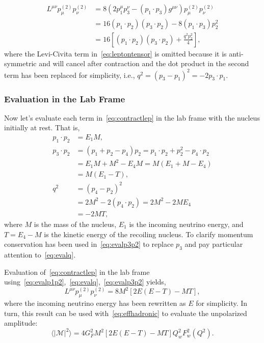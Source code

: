 \begin{align}
L^{\mu \nu}p_{\mu}^{(2)}p_{\nu}^{(2)} &= 8(2p_1^{\mu}p_3^{\nu}-(p_1\cdot p_3)g^{\mu \nu})p_{\mu}^{(2)}p_{\nu}^{(2)} \nonumber \\
&= 16(p_1\cdot p_2)(p_3\cdot p_2)-8(p_1\cdot p_3)p_2^2 \nonumber \\
&= 16\left[ (p_1\cdot p_2)(p_3\cdot p_2)+\frac{q^2p_2^2}{4}\right], \label{eq:contractlep}
\end{align}
where the Levi-Civita term in~\eqref{eq:leptontensor} is omitted because it is anti-symmetric and will cancel after contraction and the dot product in the second term has been replaced for simplicity, i.e., $q^2=(p_3-p_1)^2=-2p_3\cdot p_1$.

\subsubsection{Evaluation in the Lab Frame}
Now let's evaluate each term in~\eqref{eq:contractlep} in the lab frame with the nucleus initially at rest. That is,
\begin{align}\label{eq:evalp1p2}
p_1\cdot p_2 &= E_1M, 
\\
p_3\cdot p_2 &= (p_1+p_2-p_4)p_2= p_1\cdot p_2 +p_2^2 - p_4\cdot p_2 \nonumber \\ 
&= E_1M+M^2-E_4M = M(E_1+M-E_4)\nonumber \\
&=M(E_1-T),\label{eq:evalp3p2} 
\\
q^2 &=(p_4-p_2)^2 \nonumber \\
&= 2M^2-2(p_4\cdot p_2)=2M^2-2ME_4 \nonumber \\
&=-2MT, \label{eq:evalq}
\end{align}
where $M$ is the mass of the nucleus, $E_1$ is the incoming neutrino energy, and $T=E_4-M$ is the kinetic energy of the recoiling nucleus. To clarify momentum conservation has been used in~\eqref{eq:evalp3p2} to replace $p_3$ and pay particular attention to~\eqref{eq:evalq}. 

Evaluation of~\eqref{eq:contractlep} in the lab frame using~\eqref{eq:evalp1p2},~\eqref{eq:evalq},~\eqref{eq:evalp3p2} yields,
\begin{equation}
L^{\mu \nu}p_{\mu}^{(2)}p_{\nu}^{(2)} = 8M^2 \left[ 2E(E-T)-MT \right],
\end{equation}
where the incoming neutrino energy has been rewritten as $E$ for simplicity. In turn, this result can be used with~\eqref{eq:effhadronic} to evaluate the unpolarized amplitude:
\begin{equation}\label{eq:matrixelmt}
\langle |\mathcal{M}|^2 \rangle = 4G_F^2M^2 \left[ 2E(E-T)-MT \right] Q_{w}^2 F_{w}^2(Q^2).
\end{equation}

